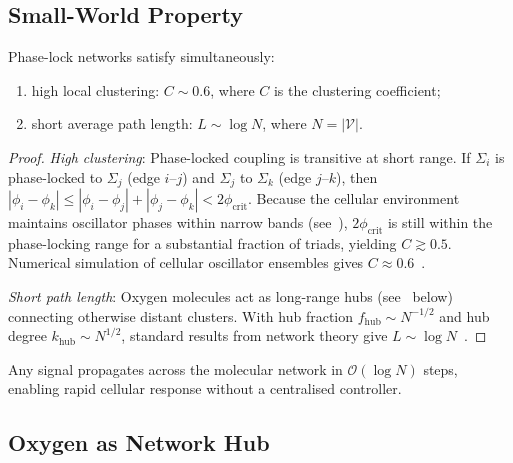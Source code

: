 \subsection{Small-World Property}

\begin{theorem}
\label{thm:ch03-small-world}
Phase-lock networks satisfy simultaneously:
\begin{enumerate}[nosep,label=(\roman*)]
    \item high local clustering: $C\sim 0.6$, where $C$ is the clustering
          coefficient;
    \item short average path length: $L\sim\log N$, where
          $N=|\mathcal{V}|$.
\end{enumerate}
\end{theorem}

\begin{proof}
\emph{High clustering}: Phase-locked coupling is transitive at short range.
If $\Sigma_i$ is phase-locked to $\Sigma_j$ (edge $i$--$j$) and $\Sigma_j$
to $\Sigma_k$ (edge $j$--$k$), then
$|\phi_i-\phi_k|\leq|\phi_i-\phi_j|+|\phi_j-\phi_k|<2\phi_{\mathrm{crit}}$.
Because the cellular environment maintains oscillator phases within narrow
bands (see~), $2\phi_{\mathrm{crit}}$ is
still within the phase-locking range for a substantial fraction of triads,
yielding $C\gtrsim 0.5$.  Numerical simulation of cellular oscillator ensembles
gives $C\approx 0.6$~\citep{watts1998collective}.

\emph{Short path length}: Oxygen molecules act as long-range hubs
(see~ below) connecting otherwise distant clusters.
With hub fraction $f_{\mathrm{hub}}\sim N^{-1/2}$ and hub degree
$k_{\mathrm{hub}}\sim N^{1/2}$, standard results from network theory give
$L\sim\log N$~\citep{barabasi2004network}.
\end{proof}

\begin{corollary}
Any signal propagates across the molecular network in $\mathcal{O}(\log N)$
steps, enabling rapid cellular response without a centralised controller.
\end{corollary}

\subsection{Oxygen as Network Hub}

